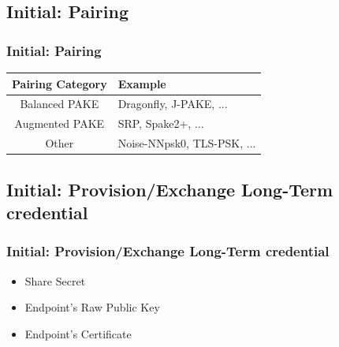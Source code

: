 \documentclass{ctexbeamer}
\begin{document}
\subsection{Initial: Pairing}
\begin{frame}
\frametitle{Initial: Pairing}


    \begin{table}[width=\textwidth]
        \begin{tabular}{ |c|l| } \hline
            \textbf{Pairing Category} & \textbf{Example} \\ \hline
            Balanced PAKE & Dragonfly, J-PAKE, ... \\ \hline
            Augmented PAKE & SRP, Spake2+, ... \\ \hline
            Other & Noise-NNpsk0, TLS-PSK, ... \\ \hline
        \end{tabular}
    \end{table}

    \end{frame}

\subsection{Initial: Provision/Exchange Long-Term credential}
\begin{frame}
\frametitle{Initial: Provision/Exchange Long-Term credential}

\begin{itemize}
    \item Share Secret
    \item Endpoint's Raw Public Key
    \item Endpoint's Certificate
\end{itemize}

    \end{frame}
\end{document}
